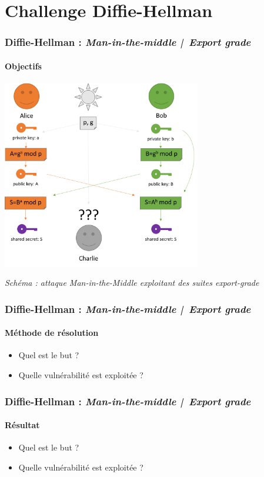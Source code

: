 
\section{Challenge Diffie-Hellman}

\begin{frame}
    \frametitle{Diffie-Hellman : \textit{Man-in-the-middle | Export grade}}
    \framesubtitle{Objectifs}
    \begin{center}
        \includegraphics[width=0.65\textwidth]{Images/diffie_key_exchange.png}
        \vspace{0.5em}

        {\small\itshape Schéma : attaque Man-in-the-Middle exploitant des suites export-grade}
    \end{center}
\end{frame}

\begin{frame}
    \frametitle{Diffie-Hellman : \textit{Man-in-the-middle | Export grade}}
    \framesubtitle{Méthode de résolution}
    \begin{itemize}
        \item Quel est le but ?
        \item Quelle vulnérabilité est exploitée ?
    \end{itemize}
\end{frame}


\begin{frame}
    \frametitle{Diffie-Hellman : \textit{Man-in-the-middle | Export grade}}
    \framesubtitle{Résultat}
    \begin{itemize}
        \item Quel est le but ?
        \item Quelle vulnérabilité est exploitée ?
    \end{itemize}
\end{frame}
